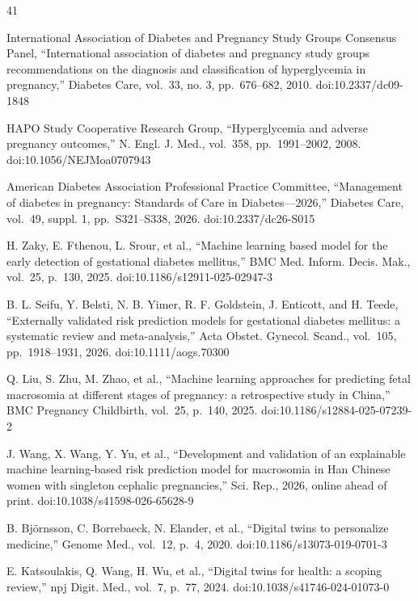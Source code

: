 \documentclass[conference]{IEEEtran}
\begin{document}
\begin{thebibliography}{41}\footnotesize

 International Association of Diabetes and Pregnancy Study Groups Consensus Panel, ``International association of diabetes and pregnancy study groups recommendations on the diagnosis and classification of hyperglycemia in pregnancy,'' Diabetes Care, vol.~33, no. 3, pp.~676--682, 2010. doi:10.2337/dc09-1848

 HAPO Study Cooperative Research Group, ``Hyperglycemia and adverse pregnancy outcomes,'' N. Engl. J. Med., vol.~358, pp.~1991--2002, 2008. doi:10.1056/NEJMoa0707943

 American Diabetes Association Professional Practice Committee, ``Management of diabetes in pregnancy: Standards of Care in Diabetes---2026,'' Diabetes Care, vol.~49, suppl. 1, pp.~S321--S338, 2026. doi:10.2337/dc26-S015

 H. Zaky, E. Fthenou, L. Srour, et al., ``Machine learning based model for the early detection of gestational diabetes mellitus,'' BMC Med. Inform. Decis. Mak., vol.~25, p.~130, 2025. doi:10.1186/s12911-025-02947-3

 B. L. Seifu, Y. Belsti, N. B. Yimer, R. F. Goldstein, J. Enticott, and H. Teede, ``Externally validated risk prediction models for gestational diabetes mellitus: a systematic review and meta-analysis,'' Acta Obstet. Gynecol. Scand., vol.~105, pp.~1918--1931, 2026. doi:10.1111/aogs.70300

 Q. Liu, S. Zhu, M. Zhao, et al., ``Machine learning approaches for predicting fetal macrosomia at different stages of pregnancy: a retrospective study in China,'' BMC Pregnancy Childbirth, vol.~25, p.~140, 2025. doi:10.1186/s12884-025-07239-2

 J. Wang, X. Wang, Y. Yu, et al., ``Development and validation of an explainable machine learning-based risk prediction model for macrosomia in Han Chinese women with singleton cephalic pregnancies,'' Sci. Rep., 2026, online ahead of print. doi:10.1038/s41598-026-65628-9

 B. Björnsson, C. Borrebaeck, N. Elander, et al., ``Digital twins to personalize medicine,'' Genome Med., vol.~12, p.~4, 2020. doi:10.1186/s13073-019-0701-3

 E. Katsoulakis, Q. Wang, H. Wu, et al., ``Digital twins for health: a scoping review,'' npj Digit. Med., vol.~7, p.~77, 2024. doi:10.1038/s41746-024-01073-0


\end{thebibliography}
\end{document}
